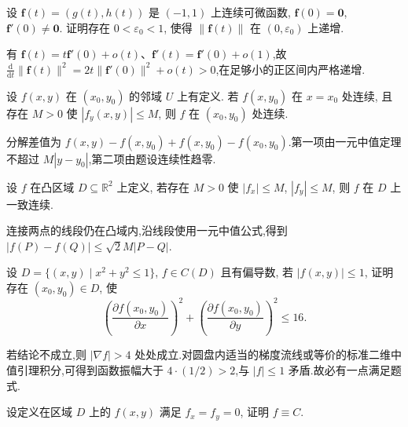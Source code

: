 \begin{example}
    设 $\bm f(t)=(g(t),h(t))$ 是 $(-1,1)$ 上连续可微函数, $\bm f(0)=\bm{0}$, $\bm f'(0)\ne\bm{0}$. 证明存在 $0<\varepsilon_0<1$, 使得 $\|\bm f(t)\|$ 在 $(0,\varepsilon_0)$ 上递增.
\end{example}
\exampleblank

\begin{solution}
    有 $\bm f(t)=t\bm f'(0)+o(t)$、$\bm f'(t)=\bm f'(0)+o(1)$,故
    $\frac{\mathrm d}{\mathrm dt}\|\bm f(t)\|^2=2t\|\bm f'(0)\|^2+o(t)>0$,在足够小的正区间内严格递增.
\end{solution}

\begin{example}
    设 $f(x,y)$ 在 $(x_0,y_0)$ 的邻域 $U$ 上有定义. 若 $f(x,y_0)$ 在 $x=x_0$ 处连续, 且存在 $M>0$ 使 $|f_y(x,y)|\leq M$, 则 $f$ 在 $(x_0,y_0)$ 处连续.
\end{example}
\exampleblank

\begin{solution}
    分解差值为 $f(x,y)-f(x,y_0)+f(x,y_0)-f(x_0,y_0)$.第一项由一元中值定理不超过 $M|y-y_0|$,第二项由题设连续性趋零.
\end{solution}

\begin{example}
    设 $f$ 在凸区域 $D\subseteq\mathbb{R}^2$ 上定义, 若存在 $M>0$ 使 $|f_x|\leq M$, $|f_y|\leq M$, 则 $f$ 在 $D$ 上一致连续.
\end{example}
\exampleblank

\begin{solution}
    连接两点的线段仍在凸域内,沿线段使用一元中值公式,得到 $|f(P)-f(Q)|\leq\sqrt{2}M|P-Q|$.
\end{solution}

\begin{example}
    设 $D=\{(x,y)\mid x^2+y^2\leq1\}$, $f\in C(D)$ 且有偏导数, 若 $|f(x,y)|\leq1$, 证明存在 $(x_0,y_0)\in D$, 使
    \[
        \left(\dfrac{\partial f(x_0,y_0)}{\partial x}\right)^2
        +\left(\dfrac{\partial f(x_0,y_0)}{\partial y}\right)^2\leq16.
    \]
\end{example}
\exampleblank

\begin{solution}
    若结论不成立,则 $|\nabla f|>4$ 处处成立.对圆盘内适当的梯度流线或等价的标准二维中值引理积分,可得到函数振幅大于 $4\cdot(1/2)>2$,与 $|f|\leq1$ 矛盾.故必有一点满足题式.
\end{solution}

\begin{example}
    设定义在区域 $D$ 上的 $f(x,y)$ 满足 $f_x=f_y=0$, 证明 $f\equiv C$.
\end{example}
\exampleblank

